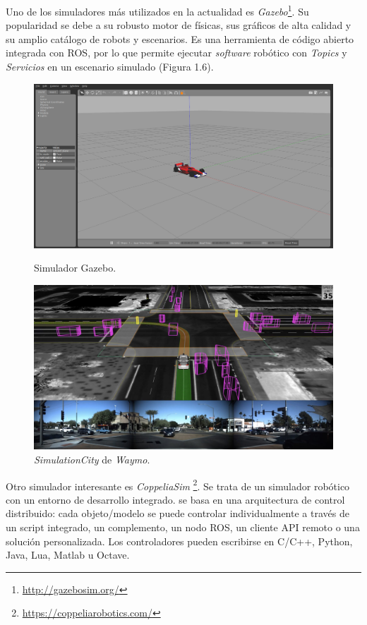 \documentclass[a4paper, 12pt]{book}
\begin{document}
Uno de los simuladores más utilizados en la actualidad es \textit{Gazebo}\footnote{\url{http://gazebosim.org/}}. Su popularidad se debe a su robusto motor de físicas, sus gráficos de alta calidad y su amplio catálogo de robots y escenarios. Es una herramienta de código abierto integrada con ROS, por lo que permite ejecutar \textit{software} robótico con \emph{Topics} y \emph{Servicios} en un escenario simulado (Figura 1.6).

\begin{figure}[H]
  \centering
  \begin{minipage}[b]{\textwidth}
  \centering
    \includegraphics[width=\textwidth]{img/gazebo}
    \caption{Simulador Gazebo.}
    \label{figura:gazebosim}
  \end{minipage}
  \hfill
  \begin{minipage}[b]{\textwidth}
  \centering
    \includegraphics[width=\textwidth]{img/waymo.jpeg}
    \caption{\emph{SimulationCity} de \emph{Waymo}.}
    \label{figura:robot_atrias}
  \end{minipage}
\end{figure}

Otro simulador interesante es \emph{CoppeliaSim} \footnote{\url{https://coppeliarobotics.com/}}. Se trata de un simulador robótico con un entorno de desarrollo integrado. se basa en una arquitectura de control distribuido: cada objeto/modelo se puede controlar individualmente a través de un script integrado, un complemento, un nodo ROS, un cliente API remoto o una solución personalizada. Los controladores pueden escribirse en  C/C++, Python, Java, Lua, Matlab u Octave.
\end{document}
